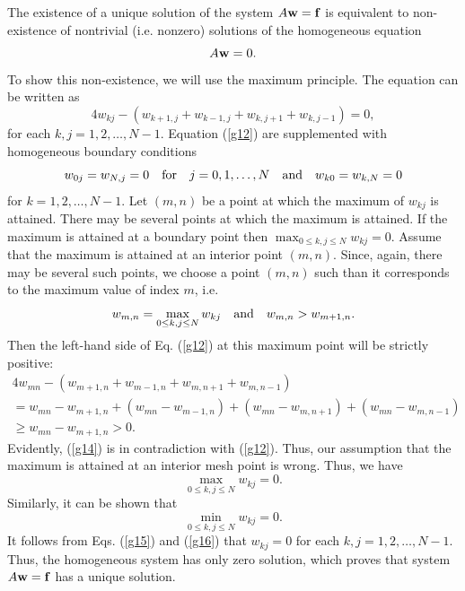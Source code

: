 The existence of a unique solution of the system $A{\bf w}={\bf f}$  is equivalent to non-existence of nontrivial
(i.e. nonzero) solutions of the homogeneous equation
\[
A{\bf w}=0.
\]
To show this non-existence, we will use the maximum principle. The equation can be written as
\begin{equation}
4w_{kj}-\left(w_{k+1,j}+w_{k-1,j}+w_{k,j+1}+w_{k,j-1}\right)
=0, \label{g12}
\end{equation}
for each $k,j=1,2,\dots,N-1$.  Equation (\ref{g12}) are supplemented with homogeneous
boundary conditions
\begin{equation}
w_{0j}=w_{N,j}=0 \quad \hbox{for} \quad j=0,1,\dots,N \quad \hbox{and} \quad
w_{k0}=w_{k,N}=0\label{g13}
\end{equation}
for $k=1,2,\dots,N-1$.
Let $(m,n)$ be a point at which the maximum of $w_{kj}$ is attained. There may be several points at
which the maximum is attained. If the maximum is attained at a boundary point then
$\max_{0\leq k,j\leq N}w_{kj}=0$.
Assume that the maximum is attained at an interior point $(m,n)$. Since, again,
there may be several such points, we choose a point $(m,n)$ such than
it corresponds to the maximum value of index $m$, i.e.
\[
w_{m,n}=\max_{0\leq k,j\leq N}w_{kj} \quad \hbox{and} \quad
w_{m,n}>w_{m+1,n}.
\]
Then the left-hand side of Eq. (\ref{g12}) at this maximum point will be strictly positive:
\begin{multline}
4w_{mn}-\left(w_{m+1,n}+w_{m-1,n}+w_{m,n+1}+w_{m,n-1}\right)\\
=w_{mn}-w_{m+1,n}+(w_{mn}-w_{m-1,n})+(w_{mn}-w_{m,n+1})+(w_{mn}-w_{m,n-1})\\
\geq w_{mn}-w_{m+1,n} > 0. \label{g14}
\end{multline}
Evidently, (\ref{g14}) is in contradiction with (\ref{g12}). Thus, our assumption that the maximum
is attained at an interior mesh point is wrong. Thus, we have
\begin{equation}
\max_{0\leq k,j\leq N}w_{kj}=0. \label{g15}
\end{equation}
Similarly, it can be shown that
\begin{equation}
\min_{0\leq k,j\leq N}w_{kj}=0. \label{g16}
\end{equation}
It follows from Eqs. (\ref{g15}) and (\ref{g16}) that $w_{kj}=0$ for
each $k,j=1,2,\dots,N-1$. Thus, the homogeneous system has only
zero solution, which proves that system $A{\bf w}={\bf f}$ has a unique
solution.


